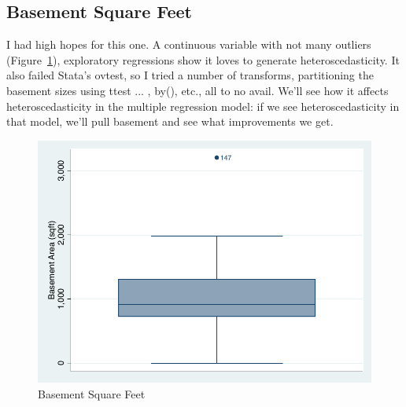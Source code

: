 \documentclass[twocolumn,11pt]{article}
\begin{document}
\subsection*{Basement Square Feet}
I had high hopes for this one.
A continuous variable with not many outliers (Figure~\ref{fig:basement-box}),
exploratory regressions show it loves to generate heteroscedasticity.
It also failed Stata's ovtest, so 
I tried a number of transforms, partitioning the basement sizes using ttest ... , by(), etc.,
all to no avail.
We'll see how it affects heteroscedasticity in the multiple regression model:
if we see heteroscedasticity in that model, we'll pull basement and see what improvements we get.
\begin{figure}[H]
\centering
  \includegraphics[width=.9\linewidth]{figures/basement-box.pdf}
  \caption{Basement Square Feet}
  \label{fig:basement-box}
\end{figure}

\end{document}

